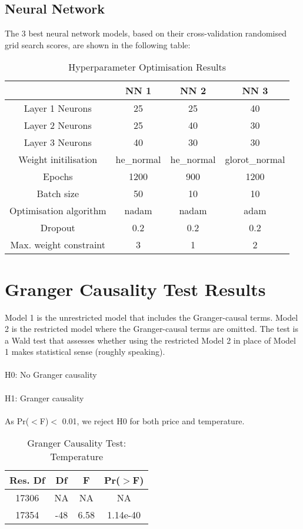 \documentclass[11pt]{article}
\begin{document}
\subsection{Neural Network}
\label{appendix:nn_validation_models}

The 3 best neural network models, based on their cross-validation randomised grid search scores, are shown in the following table:

\begin{table}[H]
\centering
\caption{Hyperparameter Optimisation Results}
\label{table:hyperparameter_optimisation_results}
\begin{tabular}{@{}cccc@{}}
\toprule
 & \textbf{NN 1} & \textbf{NN 2} & \textbf{NN 3} \\ \midrule
Layer 1 Neurons & 25 & 25 & 40 \\
Layer 2 Neurons & 25 & 40 & 30 \\
Layer 3 Neurons & 40 & 30 & 30 \\
Weight initilisation & he\_normal & he\_normal & glorot\_normal \\
Epochs & 1200 & 900 & 1200 \\
Batch size & 50 & 10 & 10 \\
Optimisation algorithm & nadam & nadam & adam \\
Dropout & 0.2 & 0.2 & 0.2 \\ 
Max. weight constraint & 3 & 1 & 2 \\ \bottomrule
\end{tabular}
\end{table}

\section{Granger Causality Test Results}

Model 1 is the unrestricted model that includes the Granger-causal terms. Model 2 is the restricted model where the Granger-causal terms are omitted.
The test is a Wald test that assesses whether using the restricted Model 2 in place of Model 1 makes statistical sense (roughly speaking).
\\
\\
H0: No Granger causality
\\
\\
H1: Granger causality
\\
\\
As Pr($<$F)$<$ 0.01, we reject H0 for both price and temperature.

\begin{table}[H]
\centering
\caption{Granger Causality Test: Temperature}
\label{table:granger_temp}
\begin{tabular}{@{}cccc@{}}
\toprule
 \textbf{Res. Df} & \textbf{Df} & \textbf{F} & \textbf{Pr($>$F)} \\ \midrule
17306 & NA & NA & NA \\
17354 & -48 & 6.58 & 1.14e-40\\ \bottomrule
\end{tabular}
\end{table}
\end{document}
